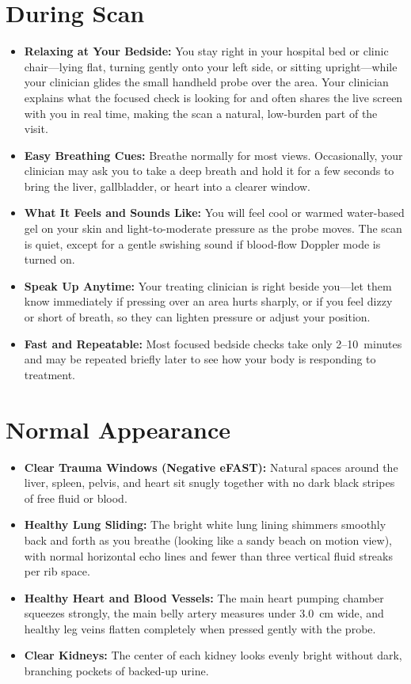 \section{During Scan}

\begin{itemize}
    \item \textbf{Relaxing at Your Bedside:} You stay right in your hospital bed or clinic chair---lying flat, turning gently onto your left side, or sitting upright---while your clinician glides the small handheld probe over the area. Your clinician explains what the focused check is looking for and often shares the live screen with you in real time, making the scan a natural, low-burden part of the visit.
    \item \textbf{Easy Breathing Cues:} Breathe normally for most views. Occasionally, your clinician may ask you to take a deep breath and hold it for a few seconds to bring the liver, gallbladder, or heart into a clearer window.
    \item \textbf{What It Feels and Sounds Like:} You will feel cool or warmed water-based gel on your skin and light-to-moderate pressure as the probe moves. The scan is quiet, except for a gentle swishing sound if blood-flow Doppler mode is turned on.
    \item \textbf{Speak Up Anytime:} Your treating clinician is right beside you---let them know immediately if pressing over an area hurts sharply, or if you feel dizzy or short of breath, so they can lighten pressure or adjust your position.
    \item \textbf{Fast and Repeatable:} Most focused bedside checks take only 2--10~minutes and may be repeated briefly later to see how your body is responding to treatment.
\end{itemize}

\section{Normal Appearance}

\begin{itemize}
    \item \textbf{Clear Trauma Windows (Negative eFAST):} Natural spaces around the liver, spleen, pelvis, and heart sit snugly together with no dark black stripes of free fluid or blood.
    \item \textbf{Healthy Lung Sliding:} The bright white lung lining shimmers smoothly back and forth as you breathe (looking like a sandy beach on motion view), with normal horizontal echo lines and fewer than three vertical fluid streaks per rib space.
    \item \textbf{Healthy Heart and Blood Vessels:} The main heart pumping chamber squeezes strongly, the main belly artery measures under 3.0~cm wide, and healthy leg veins flatten completely when pressed gently with the probe.
    \item \textbf{Clear Kidneys:} The center of each kidney looks evenly bright without dark, branching pockets of backed-up urine.
\end{itemize}

